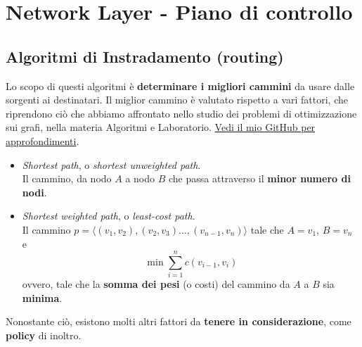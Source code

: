 \chapter{Network Layer - Piano di controllo}

\section{Algoritmi di Instradamento (routing)}
Lo scopo di questi algoritmi è \textbf{determinare i migliori cammini} da usare dalle sorgenti ai destinatari. Il miglior cammino è valutato rispetto a vari fattori, che riprendono ciò che abbiamo affrontato nello studio dei problemi di ottimizzazione sui grafi, nella materia Algoritmi e Laboratorio. \href{https://github.com/BoredDam/Algoritmi}{Vedi il mio GitHub per approfondimenti}.

\begin{itemize}
	\item \textit{Shortest path}, o \textit{shortest unweighted path}.\\
	Il cammino, da nodo $A$ a nodo $B$ che passa attraverso il \textbf{minor numero di nodi}.
	
	\item \textit{Shortest weighted path}, o \textit{least-cost path}.\\
	Il cammino $p= \langle (v_1, v_2), (v_2, v_3) \dots, (v_{n-1},v_n) \rangle$ tale che $A=v_1$, $B = v_n$ e 
	$$
	\min \sum_{i=1}^n c(v_{i-1}, v_i)
	$$
	ovvero, tale che la \textbf{somma dei pesi} (o costi) del cammino da $A$ a $B$ sia \textbf{minima}.
\end{itemize}

Nonostante ciò, esistono molti altri fattori da \textbf{tenere in considerazione}, come \textbf{policy} di inoltro.

